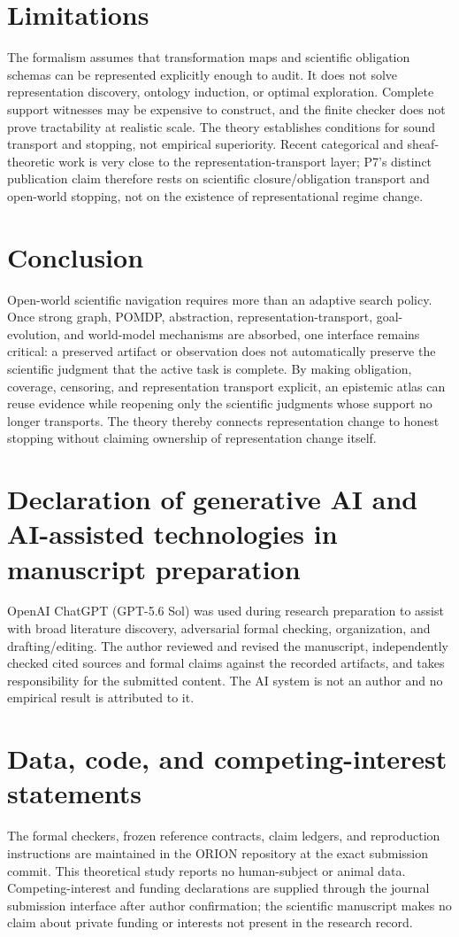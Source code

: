 \documentclass[11pt]{article}
\begin{document}
\section{Limitations}
The formalism assumes that transformation maps and scientific obligation schemas can be represented explicitly enough to audit. It does not solve representation discovery, ontology induction, or optimal exploration. Complete support witnesses may be expensive to construct, and the finite checker does not prove tractability at realistic scale. The theory establishes conditions for sound transport and stopping, not empirical superiority. Recent categorical and sheaf-theoretic work is very close to the representation-transport layer; P7's distinct publication claim therefore rests on scientific closure/obligation transport and open-world stopping, not on the existence of representational regime change.

\section{Conclusion}
Open-world scientific navigation requires more than an adaptive search policy. Once strong graph, POMDP, abstraction, representation-transport, goal-evolution, and world-model mechanisms are absorbed, one interface remains critical: a preserved artifact or observation does not automatically preserve the scientific judgment that the active task is complete. By making obligation, coverage, censoring, and representation transport explicit, an epistemic atlas can reuse evidence while reopening only the scientific judgments whose support no longer transports. The theory thereby connects representation change to honest stopping without claiming ownership of representation change itself.

\section*{Declaration of generative AI and AI-assisted technologies in manuscript preparation}
OpenAI ChatGPT (GPT-5.6 Sol) was used during research preparation to assist with broad literature discovery, adversarial formal checking, organization, and drafting/editing. The author reviewed and revised the manuscript, independently checked cited sources and formal claims against the recorded artifacts, and takes responsibility for the submitted content. The AI system is not an author and no empirical result is attributed to it.

\section*{Data, code, and competing-interest statements}
The formal checkers, frozen reference contracts, claim ledgers, and reproduction instructions are maintained in the ORION repository at the exact submission commit. This theoretical study reports no human-subject or animal data. Competing-interest and funding declarations are supplied through the journal submission interface after author confirmation; the scientific manuscript makes no claim about private funding or interests not present in the research record.
\end{document}

